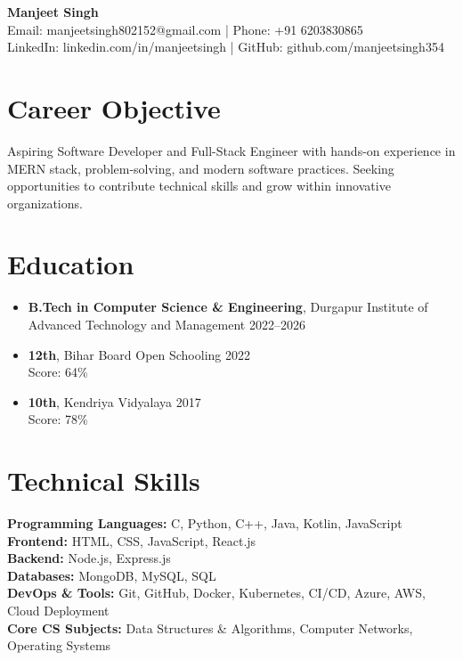 \documentclass[a4paper,11pt]{article}
\begin{document}
\begin{center}
{\LARGE \textbf{Manjeet Singh}} \\[4pt]
Email: manjeetsingh802152@gmail.com \quad | \quad Phone: +91 6203830865 \\[2pt]
LinkedIn: linkedin.com/in/manjeetsingh \quad | \quad GitHub: github.com/manjeetsingh354
\end{center}
\vspace{0.5cm}

\section*{Career Objective}
Aspiring Software Developer and Full-Stack Engineer with hands-on experience in MERN stack, problem-solving, and modern software practices. Seeking opportunities to contribute technical skills and grow within innovative organizations.

\section*{Education}
\begin{itemize}[leftmargin=*]
  \item \textbf{B.Tech in Computer Science \& Engineering}, Durgapur Institute of Advanced Technology and Management \hfill 2022--2026
  \item \textbf{12th}, Bihar Board Open Schooling \hfill 2022 \\
  Score: 64\%
  \item \textbf{10th}, Kendriya Vidyalaya \hfill 2017 \\
  Score: 78\%
\end{itemize}

\section*{Technical Skills}
\textbf{Programming Languages:} C, Python, C++, Java, Kotlin, JavaScript \\
\textbf{Frontend:} HTML, CSS, JavaScript, React.js \\
\textbf{Backend:} Node.js, Express.js \\
\textbf{Databases:} MongoDB, MySQL, SQL \\
\textbf{DevOps \& Tools:} Git, GitHub, Docker, Kubernetes, CI/CD, Azure, AWS, Cloud Deployment \\
\textbf{Core CS Subjects:} Data Structures \& Algorithms, Computer Networks, Operating Systems
\end{document}
